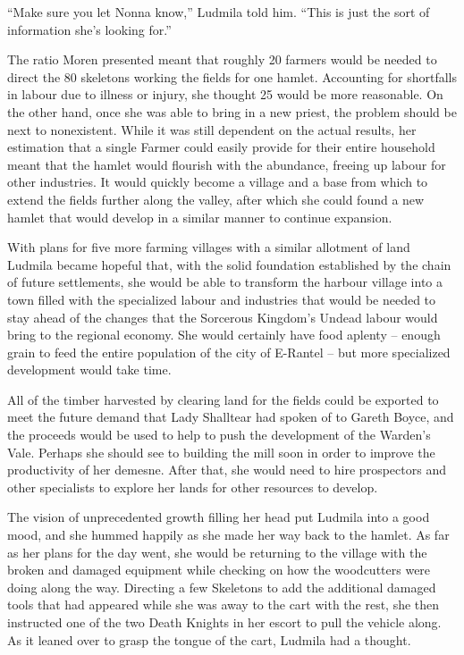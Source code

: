  

“Make sure you let Nonna know,” Ludmila told him. “This is just the sort of information she’s looking for.”

 

The ratio Moren presented meant that roughly 20 farmers would be needed to direct the 80 skeletons working the fields for one hamlet. Accounting for shortfalls in labour due to illness or injury, she thought 25 would be more reasonable. On the other hand, once she was able to bring in a new priest, the problem should be next to nonexistent. While it was still dependent on the actual results, her estimation that a single Farmer could easily provide for their entire household meant that the hamlet would flourish with the abundance, freeing up labour for other industries. It would quickly become a village and a base from which to extend the fields further along the valley, after which she could found a new hamlet that would develop in a similar manner to continue expansion.

 

With plans for five more farming villages with a similar allotment of land Ludmila became hopeful that, with the solid foundation established by the chain of future settlements, she would be able to transform the harbour village into a town filled with the specialized labour and industries that would be needed to stay ahead of the changes that the Sorcerous Kingdom’s Undead labour would bring to the regional economy. She would certainly have food aplenty – enough grain to feed the entire population of the city of E-Rantel – but more specialized development would take time.

 

All of the timber harvested by clearing land for the fields could be exported to meet the future demand that Lady Shalltear had spoken of to Gareth Boyce, and the proceeds would be used to help to push the development of the Warden’s Vale. Perhaps she should see to building the mill soon in order to improve the productivity of her demesne. After that, she would need to hire prospectors and other specialists to explore her lands for other resources to develop.

 

The vision of unprecedented growth filling her head put Ludmila into a good mood, and she hummed happily as she made her way back to the hamlet. As far as her plans for the day went, she would be returning to the village with the broken and damaged equipment while checking on how the woodcutters were doing along the way. Directing a few Skeletons to add the additional damaged tools that had appeared while she was away to the cart with the rest, she then instructed one of the two Death Knights in her escort to pull the vehicle along. As it leaned over to grasp the tongue of the cart, Ludmila had a thought.

